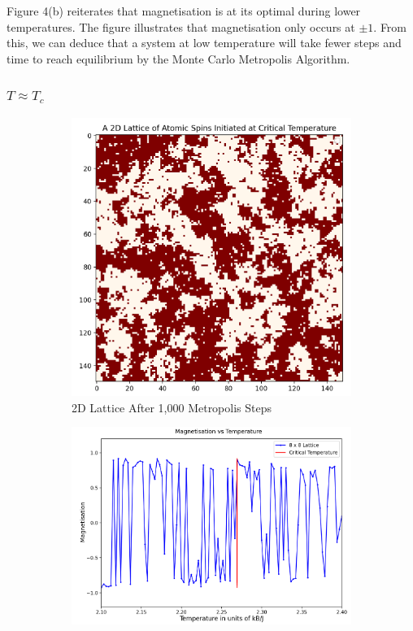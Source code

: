 \documentclass[a4paper]{article}
\begin{document}
Figure 4(b) reiterates that magnetisation is at its optimal during lower temperatures. The figure illustrates that magnetisation only occurs at $\pm{1}$. From this, we can deduce that a system at low temperature will take fewer steps and time to reach equilibrium by the Monte Carlo Metropolis Algorithm.

\subsubsection{$T \approx T_{c}$}

\begin{figure}[h]
\centering
\begin{subfigure}{0.4\textwidth}
\includegraphics[width=1\linewidth]{2D Lattice Critical Temp.png} 
\caption{2D Lattice After 1,000 Metropolis Steps}
\label{fig:subim1}
\end{subfigure}
\begin{subfigure}{0.5\textwidth}
\includegraphics[width=1.1\linewidth,left]{mag vs temp critical temp.png}

\end{subfigure}
\end{figure}
\end{document}
